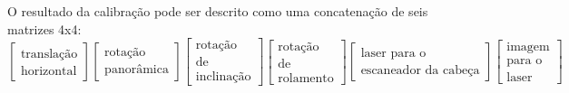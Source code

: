 O resultado da calibração pode ser descrito como uma concatenação de seis matrizes 4x4:
\[
\begin{bmatrix}
\text{translação} \\ 
\text{horizontal}
\end{bmatrix}
\begin{bmatrix}
\text{rotação} \\ 
\text{panorâmica}
\end{bmatrix}
\begin{bmatrix}
\text{rotação} \\
\text{de} \\
\text{inclinação}
\end{bmatrix}
\begin{bmatrix}
\text{rotação} \\
\text{de} \\
\text{rolamento}
\end{bmatrix}
\begin{bmatrix}
\text{laser para o} \\
\text{escaneador }
\text{da cabeça}
\end{bmatrix}
\begin{bmatrix}
\text{imagem} \\
\text{para o} \\
\text{laser}
\end{bmatrix}
\]




